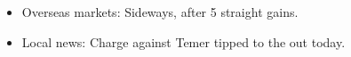 \begin{itemize}
\item
  Overseas markets: Sideways, after 5 straight gains.
\item
  Local news: Charge against Temer tipped to the out today.
\end{itemize}
